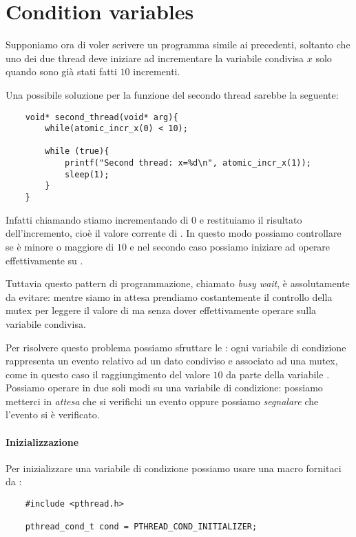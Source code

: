 \section{Condition variables}

Supponiamo ora di voler scrivere un programma simile ai precedenti, soltanto che uno dei due thread deve iniziare ad incrementare la variabile condivisa $x$ solo quando sono già stati fatti $10$ incrementi.

Una possibile soluzione per la funzione del secondo thread sarebbe la seguente:
\begin{verbatim}
    void* second_thread(void* arg){
        while(atomic_incr_x(0) < 10);

        while (true){
            printf("Second thread: x=%d\n", atomic_incr_x(1));
            sleep(1);
        }
    }
\end{verbatim}

Infatti chiamando  stiamo incrementando  di $0$ e restituiamo il risultato dell'incremento, cioè il valore corrente di . In questo modo possiamo controllare se è minore o maggiore di $10$ e nel secondo caso possiamo iniziare ad operare effettivamente su .

Tuttavia questo pattern di programmazione, chiamato \emph{busy wait}, è assolutamente da evitare: mentre siamo in attesa prendiamo costantemente il controllo della mutex per leggere il valore di  ma senza dover effettivamente operare sulla variabile condivisa.

Per risolvere questo problema possiamo sfruttare le : ogni variabile di condizione rappresenta un evento relativo ad un dato condiviso e associato ad una mutex, come in questo caso il raggiungimento del valore $10$ da parte della variabile . Possiamo operare in due soli modi su una variabile di condizione: possiamo metterci in \emph{attesa} che si verifichi un evento oppure possiamo \emph{segnalare} che l'evento si è verificato.

\paragraph{Inizializzazione}
Per inizializzare una variabile di condizione possiamo usare una macro fornitaci da :
\begin{verbatim}
    #include <pthread.h>

    pthread_cond_t cond = PTHREAD_COND_INITIALIZER;
\end{verbatim}

